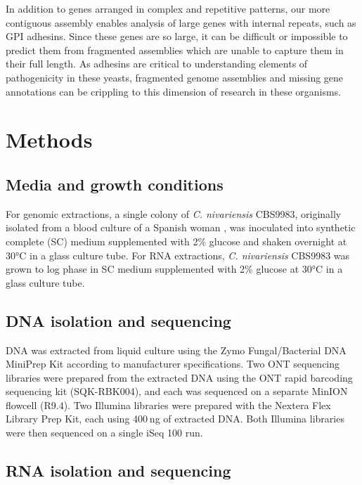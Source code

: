 In addition to genes arranged in complex and repetitive patterns, our more contiguous assembly enables analysis of large genes with internal repeats, such as GPI adhesins. Since these genes are so large, it can be difficult or impossible to predict them from fragmented assemblies which are unable to capture them in their full length. As adhesins are critical to understanding elements of pathogenicity in these yeasts, fragmented genome assemblies and missing gene annotations can be crippling to this dimension of research in these organisms.


\section{Methods}
\label{sec:methods}

\subsection{Media and growth conditions}
\label{sec:methods}

For genomic extractions, a single colony of \textit{C. nivariensis} CBS9983, originally isolated from a blood culture of a Spanish woman \citep{Alcoba-Florez2005-xn}, was inoculated into synthetic complete (SC) medium supplemented with 2\% glucose and shaken overnight at 30°C in a glass culture tube. For RNA extractions, \textit{C. nivariensis} CBS9983 was grown to log phase in SC medium supplemented with 2\% glucose at 30°C in a glass culture tube.

\subsection{DNA isolation and sequencing}
\label{sec:methods}

DNA was extracted from liquid culture using the Zymo Fungal/Bacterial DNA MiniPrep Kit according to manufacturer specifications. Two ONT sequencing libraries were prepared from the extracted DNA using the ONT rapid barcoding sequencing kit (SQK-RBK004), and each was sequenced on a separate MinION flowcell (R9.4). Two Illumina libraries were prepared with the Nextera Flex Library Prep Kit, each using 400 ng of extracted DNA. Both Illumina libraries were then sequenced on a single iSeq 100 run.

\subsection{RNA isolation and sequencing}
\label{sec:methods}

